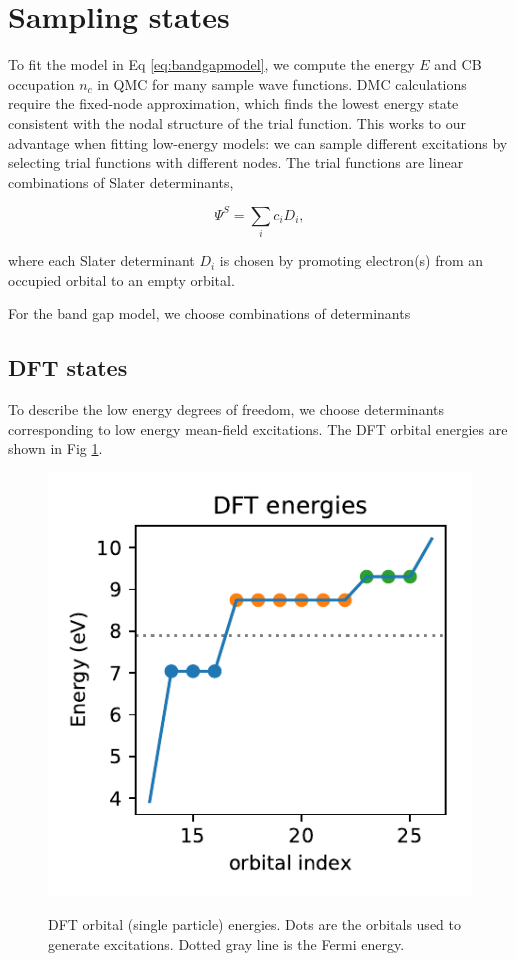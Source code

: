 \section {Sampling states}

To fit the model in Eq \ref{eq:bandgapmodel}, we compute the energy $E$ and CB occupation $n_c$ in QMC for many sample wave functions.
DMC calculations require the fixed-node approximation, which finds the lowest energy state consistent with the nodal structure of the trial function.
This works to our advantage when fitting low-energy models: we can sample different excitations by selecting trial functions with different nodes. 
The trial functions are linear combinations of Slater determinants,

\begin{equation}
\Psi^S = \sum_i c_i D_i,
\end{equation}

where each Slater determinant $D_i$ is chosen by promoting electron(s) from an occupied orbital to an empty orbital.


For the band gap model, we choose combinations of determinants 


\subsection{DFT states}
To describe the low energy degrees of freedom, we choose determinants corresponding to low energy mean-field excitations.
The DFT orbital energies are shown in Fig \ref{fig:dft_energies}.

\begin{figure}[h]
\begin{center}
\includegraphics{images/dft_energies_k888.pdf}
\label{fig:dft_energies}
\caption{DFT orbital (single particle) energies. 
Dots are the orbitals used to generate excitations. 
Dotted gray line is the Fermi energy.}
\end{center}
\end{figure}

